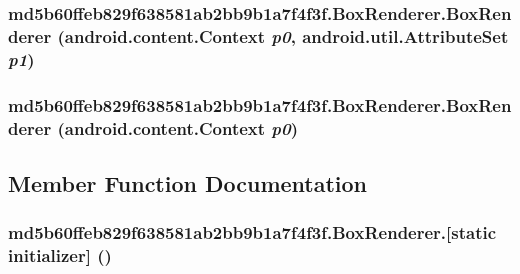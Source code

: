 \hypertarget{classmd5b60ffeb829f638581ab2bb9b1a7f4f3f_1_1_box_renderer_6500633c0eb2247796670cf8d19b41c0}{
\subsubsection[{BoxRenderer}]{\setlength{\rightskip}{0pt plus 5cm}md5b60ffeb829f638581ab2bb9b1a7f4f3f.BoxRenderer.BoxRenderer (android.content.Context {\em p0}, \/  android.util.AttributeSet {\em p1})}}
\label{classmd5b60ffeb829f638581ab2bb9b1a7f4f3f_1_1_box_renderer_6500633c0eb2247796670cf8d19b41c0}


\hypertarget{classmd5b60ffeb829f638581ab2bb9b1a7f4f3f_1_1_box_renderer_2b1771eeb58746c23b513587c18ea9de}{
\subsubsection[{BoxRenderer}]{\setlength{\rightskip}{0pt plus 5cm}md5b60ffeb829f638581ab2bb9b1a7f4f3f.BoxRenderer.BoxRenderer (android.content.Context {\em p0})}}
\label{classmd5b60ffeb829f638581ab2bb9b1a7f4f3f_1_1_box_renderer_2b1771eeb58746c23b513587c18ea9de}




\subsection{Member Function Documentation}
\hypertarget{classmd5b60ffeb829f638581ab2bb9b1a7f4f3f_1_1_box_renderer_f97ff50dfcff9831850ece527ffb8a87}{
\subsubsection[{[static initializer]}]{\setlength{\rightskip}{0pt plus 5cm}md5b60ffeb829f638581ab2bb9b1a7f4f3f.BoxRenderer.\mbox{[}static initializer\mbox{]} ()}}
\label{classmd5b60ffeb829f638581ab2bb9b1a7f4f3f_1_1_box_renderer_f97ff50dfcff9831850ece527ffb8a87}




